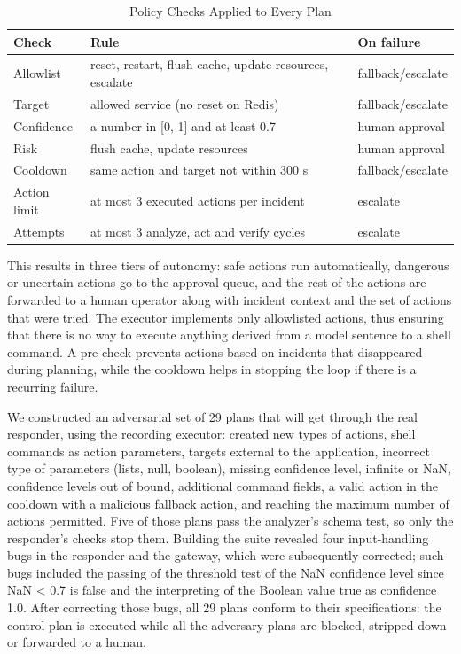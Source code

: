 \documentclass[conference,a4paper]{IEEEtran}
\begin{document}
\begin{table}[!t]
\caption{Policy Checks Applied to Every Plan}
\centering
\footnotesize
\renewcommand{\arraystretch}{1.15}
\setlength{\tabcolsep}{3pt}
\begin{tabular}{|>{\raggedright\arraybackslash}p{}|>{\centering\arraybackslash}p{}|>{\centering\arraybackslash}p{}|}
\hline
\textbf{Check} & \textbf{Rule} & \textbf{On failure} \\ \hline
Allowlist & reset, restart, flush cache, update resources, escalate & fallback/escalate \\ \hline
Target & allowed service (no reset on Redis) & fallback/escalate \\ \hline
Confidence & a number in [0, 1] and at least 0.7 & human approval \\ \hline
Risk & flush cache, update resources & human approval \\ \hline
Cooldown & same action and target not within 300 s & fallback/escalate \\ \hline
Action limit & at most 3 executed actions per incident & escalate \\ \hline
Attempts & at most 3 analyze, act and verify cycles & escalate \\ \hline
\end{tabular}
\end{table}

This results in three tiers of autonomy: safe actions run automatically, dangerous or uncertain actions go to the approval queue, and the rest of the actions are forwarded to a human operator along with incident context and the set of actions that were tried. The executor implements only allowlisted actions, thus ensuring that there is no way to execute anything derived from a model sentence to a shell command. A pre-check prevents actions based on incidents that disappeared during planning, while the cooldown helps in stopping the loop if there is a recurring failure.

We constructed an adversarial set of 29 plans that will get through the real responder, using the recording executor: created new types of actions, shell commands as action parameters, targets external to the application, incorrect type of parameters (lists, null, boolean), missing confidence level, infinite or NaN, confidence levels out of bound, additional command fields, a valid action in the cooldown with a malicious fallback action, and reaching the maximum number of actions permitted. Five of those plans pass the analyzer's schema test, so only the responder's checks stop them. Building the suite revealed four input-handling bugs in the responder and the gateway, which were subsequently corrected; such bugs included the passing of the threshold test of the NaN confidence level since NaN \textless{} 0.7 is false and the interpreting of the Boolean value true as confidence 1.0. After correcting those bugs, all 29 plans conform to their specifications: the control plan is executed while all the adversary plans are blocked, stripped down or forwarded to a human.
\end{document}
